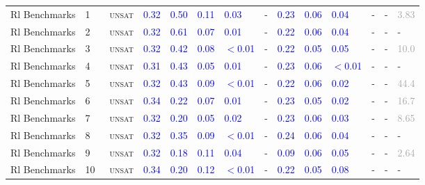 \begin{center}
{\begin{longtable}{@{}llllllllllllll@{}}
Rl Benchmarks & 1 & ~\textsc{unsat} & \textcolor{blue}{0.32} & \textcolor{blue}{0.50} & \textcolor{blue}{0.11} & \textcolor{blue}{0.03} & - & \textcolor{blue}{0.23} & \textcolor{blue}{0.06} & \textcolor{blue}{0.04} & - & - & \textcolor{darkgray}{3.83} \\
Rl Benchmarks & 2 & ~\textsc{unsat} & \textcolor{blue}{0.32} & \textcolor{blue}{0.61} & \textcolor{blue}{0.07} & \textcolor{blue}{0.01} & - & \textcolor{blue}{0.22} & \textcolor{blue}{0.06} & \textcolor{blue}{0.04} & - & - & - \\
Rl Benchmarks & 3 & ~\textsc{unsat} & \textcolor{blue}{0.32} & \textcolor{blue}{0.42} & \textcolor{blue}{0.08} & \textcolor{blue}{$<$0.01} & - & \textcolor{blue}{0.22} & \textcolor{blue}{0.05} & \textcolor{blue}{0.05} & - & - & \textcolor{darkgray}{10.0} \\
Rl Benchmarks & 4 & ~\textsc{unsat} & \textcolor{blue}{0.31} & \textcolor{blue}{0.43} & \textcolor{blue}{0.05} & \textcolor{blue}{0.01} & - & \textcolor{blue}{0.23} & \textcolor{blue}{0.06} & \textcolor{blue}{$<$0.01} & - & - & - \\
Rl Benchmarks & 5 & ~\textsc{unsat} & \textcolor{blue}{0.32} & \textcolor{blue}{0.43} & \textcolor{blue}{0.09} & \textcolor{blue}{$<$0.01} & - & \textcolor{blue}{0.22} & \textcolor{blue}{0.06} & \textcolor{blue}{0.02} & - & - & \textcolor{darkgray}{44.4} \\
Rl Benchmarks & 6 & ~\textsc{unsat} & \textcolor{blue}{0.34} & \textcolor{blue}{0.22} & \textcolor{blue}{0.07} & \textcolor{blue}{0.01} & - & \textcolor{blue}{0.23} & \textcolor{blue}{0.05} & \textcolor{blue}{0.02} & - & - & \textcolor{darkgray}{16.7} \\
Rl Benchmarks & 7 & ~\textsc{unsat} & \textcolor{blue}{0.32} & \textcolor{blue}{0.20} & \textcolor{blue}{0.05} & \textcolor{blue}{0.02} & - & \textcolor{blue}{0.23} & \textcolor{blue}{0.06} & \textcolor{blue}{0.03} & - & - & \textcolor{darkgray}{8.65} \\
Rl Benchmarks & 8 & ~\textsc{unsat} & \textcolor{blue}{0.32} & \textcolor{blue}{0.35} & \textcolor{blue}{0.09} & \textcolor{blue}{$<$0.01} & - & \textcolor{blue}{0.24} & \textcolor{blue}{0.06} & \textcolor{blue}{0.04} & - & - & - \\
Rl Benchmarks & 9 & ~\textsc{unsat} & \textcolor{blue}{0.32} & \textcolor{blue}{0.18} & \textcolor{blue}{0.11} & \textcolor{blue}{0.04} & - & \textcolor{blue}{0.09} & \textcolor{blue}{0.06} & \textcolor{blue}{0.05} & - & - & \textcolor{darkgray}{2.64} \\
Rl Benchmarks & 10 & ~\textsc{unsat} & \textcolor{blue}{0.34} & \textcolor{blue}{0.20} & \textcolor{blue}{0.12} & \textcolor{blue}{$<$0.01} & - & \textcolor{blue}{0.22} & \textcolor{blue}{0.05} & \textcolor{blue}{0.08} & - & - & - \\

\end{longtable}}
\end{center}

